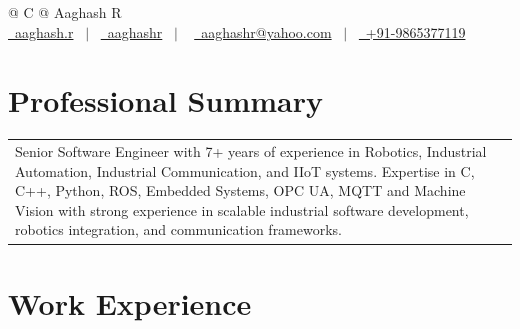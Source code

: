\documentclass[a4paper,12pt]{article}
\newcommand{\contact}[3]{\href{#1}{\raisebox{-0.05\height}#2\ #3}}
\begin{document}
\pagestyle{empty} 


\begin{tabularx}{\linewidth}{@{} C @{}}
\Huge{Aaghash R} \\[6pt]
\contact{https://github.com/aaghash17}{\faGithub}{aaghash.r} \ $|$ \ 
\contact{https://linkedin.com/in/aaghashr}{\faLinkedin}{aaghashr} \ $|$ \ 
\contact{mailto:aaghashr@yahoo.com}{\faEnvelope}{aaghashr@yahoo.com} \ $|$ \ 
\contact{tel:+91-9865377119}{\faMobile}{+91-9865377119} \\
\end{tabularx}



\section{Professional Summary}
\begin{tabularx}{\linewidth}{@{}X r@{}}
Senior Software Engineer with 7+ years of experience in Robotics, Industrial Automation, Industrial Communication, and IIoT systems. Expertise in C, C++, Python, ROS, Embedded Systems, OPC UA, MQTT and Machine Vision with strong experience in scalable industrial software development, robotics integration, and communication frameworks.
\end{tabularx}

\section{Work Experience}
\end{document}
